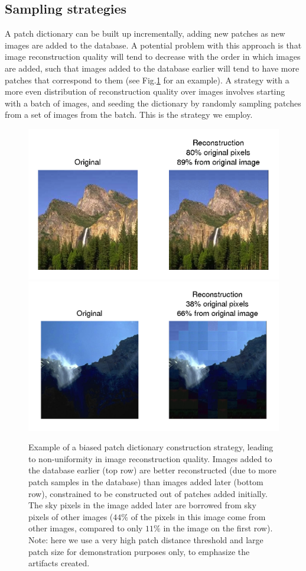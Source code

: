 \subsection{Sampling strategies}
\label{sec:sample}

A patch dictionary can be built up incrementally, adding new patches as new images are added to the database. A potential problem with this approach is that image reconstruction quality will tend to decrease with the order in which images are added, such that images added to the database earlier will tend to have more patches that correspond to them (see Fig.\ref{fig:sampStrategy} for an example). A strategy with a more even distribution of reconstruction quality over images involves starting with a batch of images, and seeding the dictionary by randomly sampling patches from a set of images from the batch. This is the strategy we employ. 

 \begin{figure}
\includegraphics[width=0.9\linewidth]{Figures/009.png}
\includegraphics[width=0.9\linewidth]{Figures/014.png}
\caption{Example of a biased patch dictionary construction strategy, leading to non-uniformity in image reconstruction quality. Images added to the database earlier (top row) are better reconstructed (due to more patch samples in the database) than images added later (bottom row), constrained to be constructed out of patches added initially. The sky pixels in the image added later are borrowed from sky pixels of other images ($44\%$ of the pixels in this image come from other images, compared to only $11\%$ in the image on the first row). Note: here we use a very high patch distance threshold and large patch size for demonstration purposes only, to emphasize the artifacts created.}
\label{fig:sampStrategy}
\end{figure}


